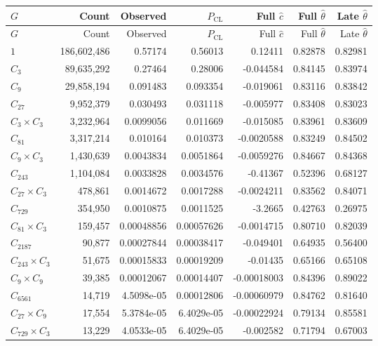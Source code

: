 \documentclass[11pt]{article}
\newcommand{\CL}{\mathrm{CL}}
\begin{document}
\begingroup
\small
\renewcommand{\arraystretch}{0.87}
\begin{longtable}{@{}lrrrrrr@{}}
\toprule
\(G\) & Count & Observed & \(P_{\CL}\) & Full \(\widehat c\) &
Full \(\widehat\theta\) & Late \(\widehat\theta\) \\
\midrule
\endfirsthead
\toprule
\(G\) & Count & Observed & \(P_{\CL}\) & Full \(\widehat c\) &
Full \(\widehat\theta\) & Late \(\widehat\theta\) \\
\midrule
\endhead
\bottomrule
\endlastfoot
\(1\) & 186,602,486 & 0.57174 & 0.56013 & 0.12411 & 0.82878 & 0.82981 \\
\(C_{3}\) & 89,635,292 & 0.27464 & 0.28006 & -0.044584 & 0.84145 & 0.83974 \\
\(C_{9}\) & 29,858,194 & 0.091483 & 0.093354 & -0.019061 & 0.83116 & 0.83842 \\
\(C_{27}\) & 9,952,379 & 0.030493 & 0.031118 & -0.005977 & 0.83408 & 0.83023 \\
\(C_{3}\!\times\!C_{3}\) & 3,232,964 & 0.0099056 & 0.011669 & -0.015085 & 0.83961 & 0.83609 \\
\(C_{81}\) & 3,317,214 & 0.010164 & 0.010373 & -0.0020588 & 0.83249 & 0.84502 \\
\(C_{9}\!\times\!C_{3}\) & 1,430,639 & 0.0043834 & 0.0051864 & -0.0059276 & 0.84667 & 0.84368 \\
\(C_{243}\) & 1,104,084 & 0.0033828 & 0.0034576 & -0.41367 & 0.52396 & 0.68127 \\
\(C_{27}\!\times\!C_{3}\) & 478,861 & 0.0014672 & 0.0017288 & -0.0024211 & 0.83562 & 0.84071 \\
\(C_{729}\) & 354,950 & 0.0010875 & 0.0011525 & -3.2665 & 0.42763 & 0.26975 \\
\(C_{81}\!\times\!C_{3}\) & 159,457 & 0.00048856 & 0.00057626 & -0.0014715 & 0.80710 & 0.82039 \\
\(C_{2187}\) & 90,877 & 0.00027844 & 0.00038417 & -0.049401 & 0.64935 & 0.56400 \\
\(C_{243}\!\times\!C_{3}\) & 51,675 & 0.00015833 & 0.00019209 & -0.01435 & 0.65166 & 0.65108 \\
\(C_{9}\!\times\!C_{9}\) & 39,385 & 0.00012067 & 0.00014407 & -0.00018003 & 0.84396 & 0.89022 \\
\(C_{6561}\) & 14,719 & 4.5098e-05 & 0.00012806 & -0.00060979 & 0.84762 & 0.81640 \\
\(C_{27}\!\times\!C_{9}\) & 17,554 & 5.3784e-05 & 6.4029e-05 & -0.00022924 & 0.79134 & 0.85581 \\
\(C_{729}\!\times\!C_{3}\) & 13,229 & 4.0533e-05 & 6.4029e-05 & -0.002582 & 0.71794 & 0.67003 \\

\end{longtable}
\end{document}
